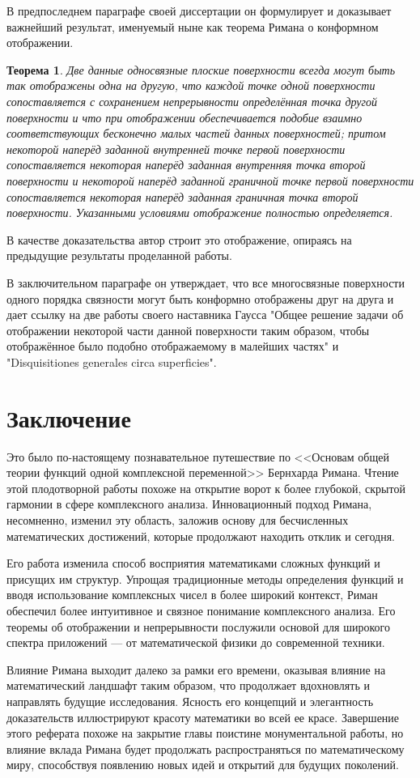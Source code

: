 \documentclass[a4paper,12pt]{article}
\newtheorem*{theorem}{Теорема}
\theoremstyle{remark}
\begin{document}
В предпоследнем параграфе своей диссертации он формулирует и доказывает
важнейший результат, именуемый ныне как теорема Римана о конформном отображении.
\begin{theorem}
  Две данные односвязные плоские поверхности всегда могут быть
  так отображены одна на другую, что каждой точке одной поверхности
  сопоставляется с сохранением непрерывности определённая точка другой
  поверхности и что при отображении обеспечивается подобие взаимно
  соответствующих бесконечно малых частей данных поверхностей;
  притом некоторой наперёд заданной внутренней точке первой поверхности
  сопоставляется некоторая наперёд заданная внутренняя точка второй
  поверхности и некоторой наперёд заданной граничной точке
  первой поверхности сопоставляется некоторая наперёд заданная
  граничная точка второй поверхности. Указанными условиями отображение
  полностью определяется.
\end{theorem}
В качестве доказательства автор строит это отображение, опираясь на предыдущие результаты проделанной работы.

В заключительном параграфе он утверждает, что все многосвязные поверхности
одного порядка связности могут быть конформно отображены друг на друга
и дает ссылку на две работы своего наставника Гаусса "Общее решение задачи об отображении некоторой
части данной поверхности таким образом, чтобы отображённое было
подобно отображаемому в малейших частях"\cite{GaussMappings} и "Disquisitiones generales circa superficies"\cite{Gauss}.

\newpage
\section{Заключение}

Это было по-настоящему познавательное путешествие по
<<Основам общей теории функций одной комплексной переменной>>
Бернхарда Римана.
Чтение этой плодотворной работы похоже на открытие ворот к
более глубокой, скрытой гармонии в сфере комплексного анализа.
Инновационный подход Римана, несомненно, изменил эту область,
заложив основу для бесчисленных математических достижений,
которые продолжают находить отклик и сегодня.

Его работа изменила способ восприятия математиками сложных функций
и присущих им структур. Упрощая традиционные методы определения
функций и вводя использование комплексных чисел в более широкий контекст,
Риман обеспечил более интуитивное и связное понимание комплексного
анализа. Его теоремы об отображении и непрерывности послужили основой для
широкого спектра приложений — от математической физики до современной техники.

Влияние Римана выходит далеко за рамки его времени, оказывая влияние
на математический ландшафт таким образом, что продолжает вдохновлять
и направлять будущие исследования. Ясность его концепций и элегантность доказательств
иллюстрируют красоту математики во всей ее красе. Завершение этого реферата
похоже на закрытие главы поистине монументальной работы, но влияние вклада
Римана будет продолжать распространяться по математическому миру,
способствуя появлению новых идей и открытий для будущих поколений.

\newpage
\printbibliography[title={Литература}, heading=bibnumbered]
\end{document}
